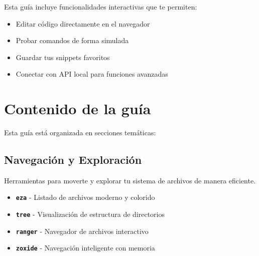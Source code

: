 \documentclass[
  11pt,
  letterpaper,
  oneside,
  openany]{scrbook}
\providecommand{\tightlist}{%
  \setlength{\itemsep}{0pt}\setlength{\parskip}{0pt}}
\begin{document}

\begin{tcolorbox}[enhanced jigsaw, coltitle=black, breakable, arc=.35mm, toprule=.15mm, colbacktitle=quarto-callout-note-color!10!white, colframe=quarto-callout-note-color-frame, opacityback=0, colback=white, bottomtitle=1mm, bottomrule=.15mm, rightrule=.15mm, left=2mm, toptitle=1mm, leftrule=.75mm, title=\textcolor{quarto-callout-note-color}{\faInfo}\hspace{0.5em}{Note}, titlerule=0mm, opacitybacktitle=0.6]

Esta guía incluye funcionalidades interactivas que te permiten:

\begin{itemize}
\tightlist
\item
  Editar código directamente en el navegador
\item
  Probar comandos de forma simulada
\item
  Guardar tus snippets favoritos
\item
  Conectar con API local para funciones avanzadas
\end{itemize}

\end{tcolorbox}

\section*{Contenido de la guía}\label{contenido-de-la-guuxeda}


Esta guía está organizada en secciones temáticas:

\subsection*{Navegación y
Exploración}\label{navegaciuxf3n-y-exploraciuxf3n}

Herramientas para moverte y explorar tu sistema de archivos de manera
eficiente.

\begin{itemize}
\tightlist
\item
  \textbf{\texttt{eza}} - Listado de archivos moderno y colorido
\item
  \textbf{\texttt{tree}} - Visualización de estructura de directorios
\item
  \textbf{\texttt{ranger}} - Navegador de archivos interactivo\\
\item
  \textbf{\texttt{zoxide}} - Navegación inteligente con memoria
\end{itemize}
\end{document}

